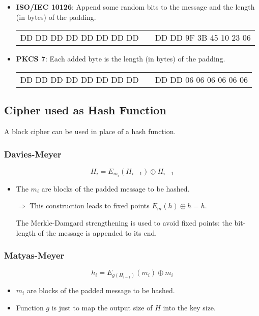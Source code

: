 \begin{itemize}
    \item \textbf{ISO/IEC 10126}: Append some random bits to the message
        and the length (in bytes) of the padding.
                \begin{center}
                    \begin{tabular}{|c|c|c|}
                        \cline{1-1} \cline{3-3}
                        DD DD DD DD DD DD DD DD & & DD DD
                        \textcolor{red!50!black}{9F 3B 45 10 23}
                        \textcolor{green!50!black}{06}\\
                        \cline{1-1} \cline{3-3}
                    \end{tabular}
                \end{center}

    \item \textbf{PKCS 7}: Each added byte is the length (in bytes) of the padding.
                \begin{center}
                    \begin{tabular}{|c|c|c|}
                        \cline{1-1} \cline{3-3}
                        DD DD DD DD DD DD DD DD & & DD DD
                        \textcolor{red!50!black}{06 06 06 06 06 06}\\
                        \cline{1-1} \cline{3-3}
                    \end{tabular}
                \end{center}
\end{itemize}

\subsection{Cipher used as Hash Function}
A block cipher can be used in place of a hash function.

\subsubsection{Davies-Meyer} 
$$H_i=E_{m_i}(H_{i-1})\oplus H_{i-1}$$ 

\begin{itemize}
    \item The $m_i$ are blocks of the padded message to be hashed. 
    \item[$\Rightarrow$] This
        construction leads to fixed points $E_m(h)\oplus h=h$.

        The Merkle-Damgard strengthening is used to avoid fixed points: the
        bit-length of the message is appended to its end.
\end{itemize}

\subsubsection{Matyas-Meyer} 
$$h_i = E_{g(H_{i-1})}(m_i)\oplus m_i$$

\begin{itemize}
    \item $m_i$ are blocks of the padded message to be hashed.
    \item Function $g$ is just to map the output size of $H$ into the key size.
\end{itemize}

